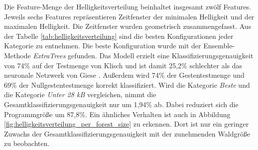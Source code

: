 Die Feature-Menge der Helligkeitsverteilung beinhaltet insgesamt zwölf Features. Jeweils sechs Features repräsentieren Zeitfenster der minimalen Helligkeit und der maximalen Helligkeit. Die Zeitfenster wurden
geometrisch zusammengefasst.
\newline
\newline
Aus der Tabelle \ref{tab:helligkeitsverteilung} sind die besten Konfigurationen jeder Kategorie zu entnehmen. Die beste Konfiguration wurde mit der Ensemble-Methode \textit{ExtraTrees} gefunden.
Das Modell erzielt eine Klassifizierungsgenauigkeit von 74\% auf der Testmenge von Klisch und ist damit 25,2\% schlechter als das neuronale Netzwerk von Giese \cite{gieseThesis}. Außerdem wird 74\% der Gestentestmenge
und 69\% der Nullgestentestmenge korrekt klassifiziert.
\newline
\newline
Wird die Kategorie \textit{Beste} und die Kategorie \textit{Unter 28 kB} vergleichen, nimmt die Gesamtklassifizierungsgenauigkeit nur um 1,94\% ab. Dabei reduziert sich die Programmgröße um 87,8\%.
Ein ähnliches Verhalten ist auch in Abbildung \ref{fig:helligkeitsverteilung_per_forest_size} zu erkennen. Dort ist nur ein geringer Zuwachs der Gesamtklassifizierungsgenauigkeit mit der zunehmenden
Waldgröße zu beobachten.